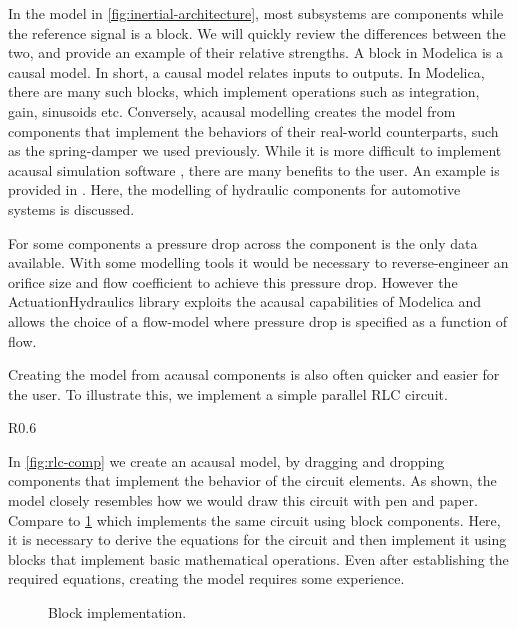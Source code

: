 \documentclass[\rootfolder/main.tex]{subfiles}
\begin{document}
In the model in \cref{fig:inertial-architecture}, most subsystems are components while the reference signal is a block.
We will quickly review the differences between the two, and provide an example of their relative strengths.
A block in Modelica is a causal model.
In short, a causal model relates inputs to outputs.
In Modelica, there are many such blocks, which implement operations such as integration, gain, sinusoids etc.
Conversely, acausal modelling creates the model from components that implement the behaviors of their real-world counterparts, such as the spring-damper we used previously.
While it is more difficult to implement acausal simulation software \cite{tiller2001}, there are many benefits to the user.
An example is provided in \cite{harman2006}.
Here, the modelling of hydraulic components for automotive systems is discussed.

\begin{displayquote}
    For some components a pressure drop across the component is the only data available.
    With some modelling tools it would be necessary to reverse-engineer an orifice size and flow coefficient to achieve this pressure drop.
    However the ActuationHydraulics library exploits the acausal capabilities of Modelica and allows the choice of a flow-model where pressure drop is specified as a function of flow.
\end{displayquote}

Creating the model from acausal components is also often quicker and easier for the user.
To illustrate this, we implement a simple parallel RLC circuit.

\begin{wrapfigure}{R}{0.6\columnwidth}
    \caption{Component implementation.\label{fig:rlc-comp}}
\end{wrapfigure}

In \cref{fig:rlc-comp} we create an acausal model, by dragging and dropping components that implement the behavior of the circuit elements.
As shown, the model closely resembles how we would draw this circuit with pen and paper.
Compare to \cref{fig:rlc-block} which implements the same circuit using block components.
Here, it is necessary to derive the equations for the circuit and then implement it using blocks that implement basic mathematical operations.
Even after establishing the required equations, creating the model requires some experience.

\begin{figure}[ht]
    \caption{Block implementation.\label{fig:rlc-block}}
\end{figure}
\end{document}
